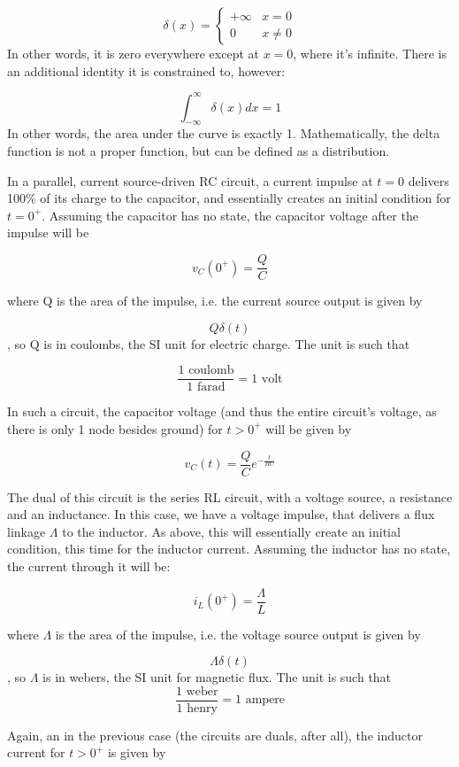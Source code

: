 \documentclass[12pt,a4paper]{report}
\begin{document}
\[ \delta(x) = \begin{cases}
   +\infty & x = 0 \\
   0       & x \neq 0
   \end{cases}
\]
In other words, it is zero everywhere except at $x = 0$, where it's infinite. There is an additional identity it is constrained to, however:

\[ \int_{-\infty}^{\infty} \delta(x) dx = 1 \]
In other words, the area under the curve is exactly 1. Mathematically, the delta function is not a proper function, but can be defined as a distribution.

In a parallel, current source-driven RC circuit, a current impulse at $t = 0$ delivers 100\% of its charge to the capacitor, and essentially creates an initial condition for $t = 0^{+}$. Assuming the capacitor has no state, the capacitor voltage after the impulse will be 

\[ v_C(0^{+}) = \frac{Q}{C} \]

where Q is the area of the impulse, i.e. the current source output is given by

\[ Q \delta(t) \], so Q is in coulombs, the SI unit for electric charge. The unit is such that

\[ \frac{1\text{ coulomb}}{1\text{ farad}} = 1\text{ volt} \]

In such a circuit, the capacitor voltage (and thus the entire circuit's voltage, as there is only 1 node besides ground) for $t > 0^{+}$ will be given by

\[ v_C(t) = \frac{Q}{C} e^{-\frac{t}{RC}} \]

The dual of this circuit is the series RL circuit, with a voltage source, a resistance and an inductance. In this case, we have a voltage impulse, that delivers a flux linkage $\Lambda$ to the inductor. As above, this will essentially create an initial condition, this time for the inductor current. Assuming the inductor has no state, the current through it will be:

\[ i_L(0^{+}) = \frac{\Lambda}{L} \]

where $\Lambda$ is the area of the impulse, i.e. the voltage source output is given by

\[ \Lambda \delta(t) \], so $\Lambda$ is in webers, the SI unit for magnetic flux. The unit is such that
\[ \frac{1\text{ weber}}{1\text{ henry}} = 1\text{ ampere} \]

Again, an in the previous case (the circuits are duals, after all), the inductor current for $t > 0^{+}$ is given by
\end{document}
